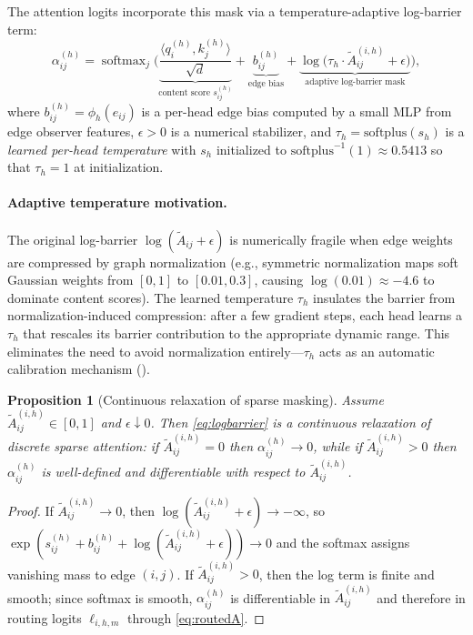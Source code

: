 \documentclass[11pt,a4paper]{article}
\newtheorem{proposition}[theorem]{Proposition}
\DeclareMathOperator{\softmax}{softmax}
\begin{document}
The attention logits incorporate this mask via a temperature-adaptive
log-barrier term:
\begin{equation}
  \label{eq:logbarrier}
  \alpha_{ij}^{(h)} = \softmax_{j}\!\Big(
    \underbrace{\frac{\langle q_i^{(h)}, k_j^{(h)} \rangle}{\sqrt{d}}}
      _{\text{content score } s_{ij}^{(h)}}
    + \underbrace{b_{ij}^{(h)}}_{\text{edge bias}}
    + \underbrace{\log\!\big(\tau_h \cdot \tilde{A}_{ij}^{(i,h)}
      + \epsilon\big)}_{\text{adaptive log-barrier mask}}
  \Big),
\end{equation}
where $b_{ij}^{(h)} = \phi_h(e_{ij})$ is a per-head edge bias computed
by a small MLP from edge observer features, $\epsilon > 0$ is a
numerical stabilizer, and $\tau_h = \mathrm{softplus}(s_h)$ is a
\emph{learned per-head temperature} with $s_h$ initialized to
$\mathrm{softplus}^{-1}(1) \approx 0.5413$ so that $\tau_h = 1$
at initialization.

\paragraph{Adaptive temperature motivation.}
The original log-barrier $\log(\tilde{A}_{ij} + \epsilon)$ is
numerically fragile when edge weights are compressed by graph
normalization (e.g., symmetric normalization maps soft Gaussian weights
from $[0, 1]$ to $[0.01, 0.3]$, causing
$\log(0.01) \approx -4.6$ to dominate content scores).
The learned temperature $\tau_h$ insulates the barrier from
normalization-induced compression: after a few gradient steps, each head
learns a $\tau_h$ that rescales its barrier contribution to the
appropriate dynamic range.
This eliminates the need to avoid normalization entirely---$\tau_h$ acts
as an automatic calibration mechanism
().

\begin{proposition}[Continuous relaxation of sparse masking]
  \label{prop:masking}
  Assume $\tilde{A}_{ij}^{(i,h)} \in [0, 1]$ and $\epsilon \downarrow 0$.
  Then \eqref{eq:logbarrier} is a continuous relaxation of discrete
  sparse attention: if $\tilde{A}_{ij}^{(i,h)} = 0$ then
  $\alpha_{ij}^{(h)} \to 0$, while if $\tilde{A}_{ij}^{(i,h)} > 0$ then
  $\alpha_{ij}^{(h)}$ is well-defined and differentiable with respect to
  $\tilde{A}_{ij}^{(i,h)}$.
\end{proposition}

\begin{proof}
  If $\tilde{A}_{ij}^{(i,h)} \to 0$, then
  $\log(\tilde{A}_{ij}^{(i,h)} + \epsilon) \to -\infty$, so
  $\exp(s_{ij}^{(h)} + b_{ij}^{(h)} +
  \log(\tilde{A}_{ij}^{(i,h)} + \epsilon)) \to 0$
  and the softmax assigns vanishing mass to edge $(i, j)$.
  If $\tilde{A}_{ij}^{(i,h)} > 0$, then the log term is finite and
  smooth; since softmax is smooth, $\alpha_{ij}^{(h)}$ is differentiable
  in $\tilde{A}_{ij}^{(i,h)}$ and therefore in routing logits
  $\ell_{i,h,m}$ through \eqref{eq:routedA}.
\end{proof}
\end{document}
